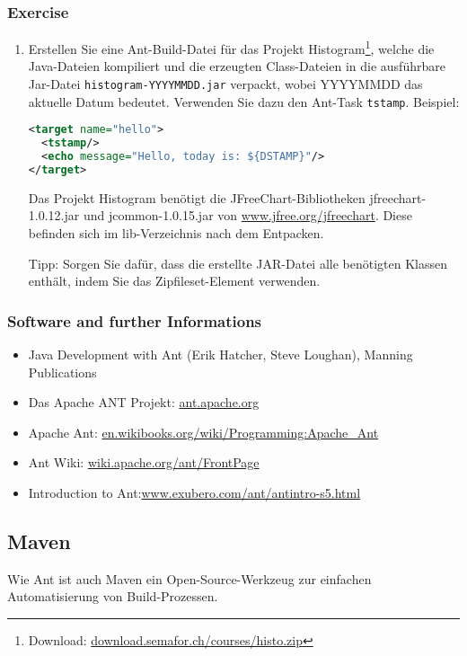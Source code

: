 \subsubsection{Exercise}
\begin{enumerate}
\item Erstellen Sie eine Ant-Build-Datei für das Projekt
Histogram\footnote{Download:
\href{http://download.semafor.ch/courses/histo.zip}
  {download.semafor.ch/courses/histo.zip}},
  welche die Java-Dateien kompiliert und die erzeugten Class-Dateien in die
  ausführbare Jar-Datei \verb+histogram-YYYYMMDD.jar+ verpackt,
  wobei YYYYMMDD das aktuelle Datum bedeutet. Verwenden Sie dazu
  den Ant-Task \verb+tstamp+. Beispiel:
\begin{lstlisting}[language=xml,morekeywords={tstamp,echo,target}]
<target name="hello">
  <tstamp/>
  <echo message="Hello, today is: ${DSTAMP}"/>
</target>
\end{lstlisting}
Das Projekt Histogram benötigt die JFreeChart-Bibliotheken
jfreechart-1.0.12.jar und jcommon-1.0.15.jar
 von
\href{http://www.jfree.org/jfreechart}{www.jfree.org/jfreechart}.
Diese befinden sich im lib-Verzeichnis nach dem Entpacken.

Tipp: Sorgen Sie dafür, dass die erstellte JAR-Datei alle benötigten Klassen
enthält, indem Sie das Zipfileset-Element verwenden.
\end{enumerate}
%
\newslide
\subsubsection{Software and further Informations}
\begin{itemize}
\item Java Development with Ant (Erik Hatcher, Steve Loughan), Manning
  Publications
\item Das Apache ANT Projekt:
  \href{http://ant.apache.org}{ant.apache.org}
\item Apache Ant:
  \href{http://en.wikibooks.org/wiki/Programming:Apache_Ant}
     {en.wikibooks.org/wiki/Programming:Apache\_Ant}
\item Ant Wiki:
  \href{http://wiki.apache.org/ant/FrontPage}{wiki.apache.org/ant/FrontPage}
\item Introduction to
  Ant:\href{http://www.exubero.com/ant/antintro-s5.html}
{www.exubero.com/ant/antintro-s5.html}
\end{itemize}
%
\newslide
%
%
\subsection{Maven}
Wie Ant ist auch Maven ein Open-Source-Werkzeug zur einfachen Automatisierung von
Build-Prozessen.

